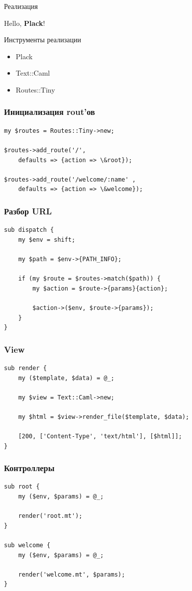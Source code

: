 \documentclass[17pt]{beamer}
\begin{document}
\begin{frame}{Реализация}
\begin{center}
    {\huge Hello, {\bf Plack}!}
\end{center}
\end{frame}

\begin{frame}{Инструменты реализации}
\begin{itemize}
    \item Plack
    \item Text::Caml
    \item Routes::Tiny
\end{itemize}
\end{frame}

\begin{frame}[fragile]
\frametitle{Инициализация rout'ов}
\begin{lstlisting}
my $routes = Routes::Tiny->new;

$routes->add_route('/',
    defaults => {action => \&root});

$routes->add_route('/welcome/:name' ,
    defaults => {action => \&welcome});
\end{lstlisting}
\end{frame}

\begin{frame}[fragile]
\frametitle{Разбор URL}
\begin{lstlisting}
sub dispatch {
    my $env = shift;

    my $path = $env->{PATH_INFO};

    if (my $route = $routes->match($path)) {
        my $action = $route->{params}{action};

        $action->($env, $route->{params});
    }
}
\end{lstlisting}
\end{frame}

\begin{frame}[fragile]
\frametitle{View}
\begin{lstlisting}
sub render {
    my ($template, $data) = @_;
    
    my $view = Text::Caml->new;
    
    my $html = $view->render_file($template, $data);

    [200, ['Content-Type', 'text/html'], [$html]];
}
\end{lstlisting}
\end{frame}

\begin{frame}[fragile]
\frametitle{Контроллеры}
\begin{lstlisting}
sub root {
    my ($env, $params) = @_;

    render('root.mt');
}

sub welcome {
    my ($env, $params) = @_;

    render('welcome.mt', $params);
}
\end{lstlisting}
\end{frame}
\end{document}
